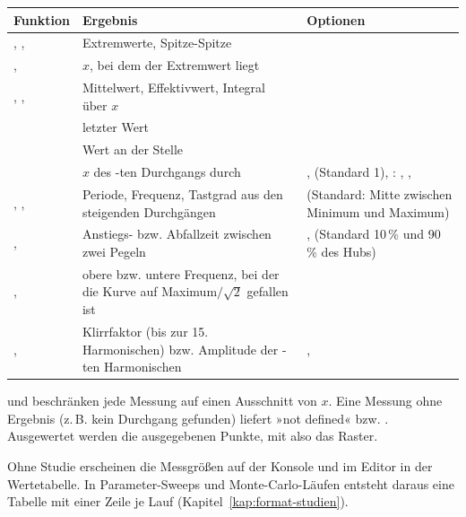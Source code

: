 \begin{longtable}{@{}P{3.2cm}P{6.4cm}P{4.2cm}@{}}
  \toprule
  Funktion & Ergebnis & Optionen \\
  \midrule
  \endhead
  \bottomrule
  \endfoot
  , ,  & Extremwerte, Spitze-Spitze & \\
  ,  & $x$, bei dem der Extremwert liegt & \\
  , ,  & Mittelwert, Effektivwert, Integral über $x$ & \\
   & letzter Wert & \\
   & Wert an der Stelle  &  \\
   & $x$ des -ten Durchgangs durch  & ,  (Standard 1), : , ,  \\
  , ,  & Periode, Frequenz, Tastgrad aus den steigenden Durchgängen &  (Standard: Mitte zwischen Minimum und Maximum) \\
  ,  & Anstiegs- bzw. Abfallzeit zwischen zwei Pegeln & ,  (Standard 10\,\% und 90\,\% des Hubs) \\
  ,  & obere bzw. untere Frequenz, bei der die Kurve auf Maximum$/\sqrt2$ gefallen ist & \\
  ,  & Klirrfaktor (bis zur 15. Harmonischen) bzw. Amplitude der -ten Harmonischen & ,  \\
\end{longtable}

 und  beschränken jede Messung auf einen Ausschnitt von
$x$. Eine Messung ohne Ergebnis (z.\,B. kein Durchgang gefunden) liefert
»not defined« bzw. . Ausgewertet werden die ausgegebenen Punkte,
mit  also das Raster.

Ohne Studie erscheinen die Messgrößen auf der Konsole und im Editor in der
Wertetabelle. In Parameter-Sweeps und Monte-Carlo-Läufen entsteht daraus
eine Tabelle mit einer Zeile je Lauf (Kapitel~\ref{kap:format-studien}).

